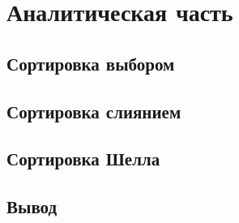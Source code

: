 \chapter{Аналитическая часть}

\section{Сортировка выбором}

\section{Сортировка слиянием}

\section{Сортировка Шелла}

\section*{Вывод}